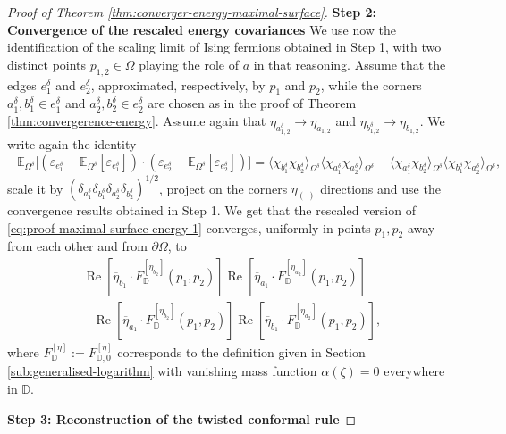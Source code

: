 \documentclass[reqno]{amsart}
\numberwithin{equation}{section}
\theoremstyle{definition}
\theoremstyle{remark}
\renewcommand\Re{\operatorname{Re}}
\begin{document}
\begin{proof}[Proof of Theorem \ref{thm:converger-energy-maximal-surface}]
\textbf{Step 2: Convergence of the rescaled energy covariances}
We use now the identification of the scaling limit of Ising fermions obtained in Step 1, with two distinct points $p_{1,2} \in \Omega$ playing the role of $a$ in that reasoning.
Assume that the edges $e_1^\delta$ and $e_2^\delta$, approximated, respectively, by $p_1$ and $p_2$, while the corners $a^\delta_1,b_1^\delta \in e_1^\delta$ and $a^\delta_2,b_2^\delta \in e_2^\delta$ are chosen as in the proof of Theorem \ref{thm:convergerence-energy}. Assume again that $\eta_{a_{1,2}^\delta} \to \eta_{a_{1,2}}$ and $\eta_{b_{1,2}^\delta} \to \eta_{b_{1,2}}$. 
 We write again the identity
\begin{equation}\label{eq:proof-maximal-surface-energy-1}
	-\mathbb{E}_{\Omega^\delta}\big[ (\varepsilon_{e_1^\delta} - \mathbb{E}_{\Omega^\delta}[\varepsilon_{e_1^\delta}]) \cdot (\varepsilon_{e_2^\delta} - \mathbb{E}_{\Omega^\delta}[\varepsilon_{e_2^\delta}]) \big]
	= \langle \chi_{b_{1}^\delta}\chi_{b_{2}^\delta} \rangle_{\Omega^\delta}\langle \chi_{a_{1}^\delta}\chi_{a_{2}^\delta} \rangle_{\Omega^\delta}
	- \langle \chi_{a_{1}^\delta}\chi_{b_{2}^\delta} \rangle_{\Omega^\delta}\langle \chi_{b_{1}^\delta}\chi_{a_{2}^\delta} \rangle_{\Omega^\delta},
\end{equation}
scale it by $(\delta_{a^\delta_1} \delta_{b^\delta_1}\delta_{a^\delta_2}\delta_{b^\delta_2})^{1/2}$, project on the corners $\eta_{(\cdot)} $ directions and use the convergence results obtained in Step 1. We get that the rescaled version of \eqref{eq:proof-maximal-surface-energy-1} converges, uniformly in points $p_1,p_2$ away from each other and from $\partial \Omega $, to  
\begin{multline*}
	\Re[\overline{\eta}_{b_1} \cdot F_{\mathbb{D}}^{[\eta_{b_2}]}(p_1,p_2)]\Re[\overline{\eta}_{a_1} \cdot F_{\mathbb{D}}^{[\eta_{a_2}]}(p_1,p_2)]\\
	- \Re[\overline{\eta}_{a_1}\cdot F_{\mathbb{D}}^{[\eta_{b_2}]}(p_1,p_2)]\Re[\overline{\eta}_{b_1}\cdot F_{\mathbb{D}}^{[\eta_{a_2}]}(p_1,p_2)],
\end{multline*}
where $F_{\mathbb{D}}^{[\eta]}:=F_{\mathbb{D},0}^{[\eta]}$ corresponds to the definition given in Section \ref{sub:generalised-logarithm} with vanishing mass function $\alpha(\zeta) = 0 $ everywhere in $\mathbb{D}$.

\textbf{Step 3: Reconstruction of the twisted conformal rule}


\end{proof}
\end{document}
